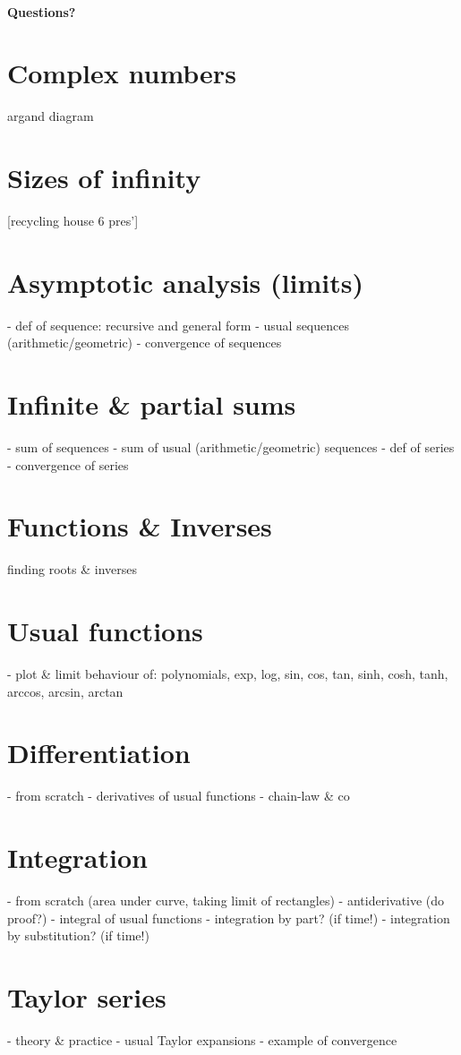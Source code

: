 \documentclass[11pt,a4paper]{article}
\begin{document}
\paragraph{Questions?}
\newpage



\section{Complex numbers}
argand diagram
\section{Sizes of infinity}
[recycling house 6 pres']

\section{Asymptotic analysis (limits)}
- def of sequence: recursive and general form
- usual sequences (arithmetic/geometric)
- convergence of sequences
\section{Infinite \& partial sums}
- sum of sequences
- sum of usual (arithmetic/geometric) sequences
- def of series
- convergence of series

\section{Functions \& Inverses}
finding roots \& inverses
\section{Usual functions}
- plot \& limit behaviour of: polynomials, exp, log, sin, cos, tan, sinh, cosh, tanh, arccos, arcsin, arctan
\section{Differentiation}
- from scratch
- derivatives of usual functions
- chain-law \& co

\section{Integration}
- from scratch (area under curve, taking limit of rectangles)
- antiderivative (do proof?)
- integral of usual functions
- integration by part? (if time!)
- integration by substitution? (if time!)
\section{Taylor series}
- theory \& practice
- usual Taylor expansions
- example of convergence
\end{document}
